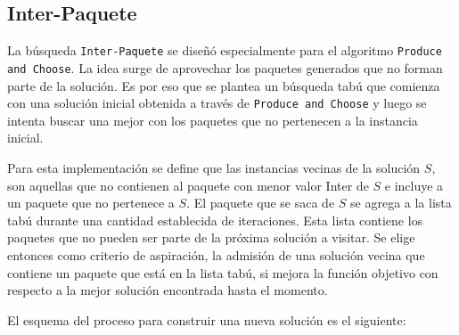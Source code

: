 \subsection{Inter-Paquete}
La búsqueda \texttt{Inter-Paquete} se diseñó especialmente para el algoritmo \texttt{Produce and Choose}. La idea surge de aprovechar los paquetes generados que no forman parte de la solución. Es por eso que se plantea un búsqueda tabú que comienza con una solución inicial obtenida a través de \texttt{Produce and Choose} y luego se intenta buscar una mejor con los paquetes que no pertenecen a la instancia inicial. 

Para esta implementación se define que las instancias vecinas de la solución $S$, son aquellas que no contienen al paquete con menor valor Inter de $S$ e incluye a un paquete que no pertenece a $S$. El paquete que se saca de $S$ se agrega a la lista tabú durante una cantidad establecida de iteraciones. Esta lista contiene los paquetes que no pueden ser parte de la próxima solución a visitar. Se elige entonces como criterio de aspiración, la admisión de una solución vecina que contiene un paquete que está en la lista tabú, si mejora la función objetivo con respecto a la mejor solución encontrada hasta el momento. 

El esquema del proceso para construir una nueva solución es el siguiente:

